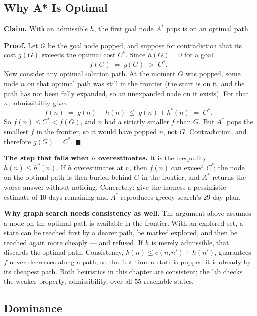 \subsection{Why A* Is Optimal}

\begin{worked}
\textbf{Claim.} With an admissible $h$, the first goal node $A^{*}$ pops is on an
optimal path.

\smallskip
\textbf{Proof.} Let $G$ be the goal node popped, and suppose for contradiction that
its cost $g(G)$ exceeds the optimal cost $C^{*}$. Since $h(G) = 0$ for a goal,
\[
  f(G) \;=\; g(G) \;>\; C^{*}.
\]
Now consider any optimal solution path. At the moment $G$ was popped, some node $n$
on that optimal path was still in the frontier (the start is on it, and the path has
not been fully expanded, so an unexpanded node on it exists). For that $n$,
admissibility gives
\[
  f(n) \;=\; g(n) + h(n) \;\le\; g(n) + h^{*}(n) \;=\; C^{*}.
\]
So $f(n) \le C^{*} < f(G)$, and $n$ had a strictly smaller $f$ than $G$. But
$A^{*}$ pops the smallest $f$ in the frontier, so it would have popped $n$, not
$G$. Contradiction, and therefore $g(G) = C^{*}$. \hfill$\blacksquare$

\smallskip
\textbf{The step that fails when $h$ overestimates.} It is the inequality
$h(n) \le h^{*}(n)$. If $h$ overestimates at $n$, then $f(n)$ can exceed $C^{*}$;
the node on the optimal path is then buried behind $G$ in the frontier, and $A^{*}$
returns the worse answer without noticing. Concretely: give the harness a
pessimistic estimate of $10$ days remaining and $A^{*}$ reproduces greedy search's
$29$-day plan.

\smallskip
\textbf{Why graph search needs consistency as well.} The argument above assumes a
node on the optimal path is available in the frontier. With an explored set, a state
can be reached first by a dearer path, be marked explored, and then be reached again
more cheaply --- and refused. If $h$ is merely admissible, that discards the optimal
path. Consistency, $h(n) \le c(n,n') + h(n')$, guarantees $f$ never decreases along
a path, so the first time a state is popped it is already by its cheapest path. Both
heuristics in this chapter are consistent; the lab checks the weaker property,
admissibility, over all $55$ reachable states.
\end{worked}

\subsection{Dominance}
\label{sec:dominance}

